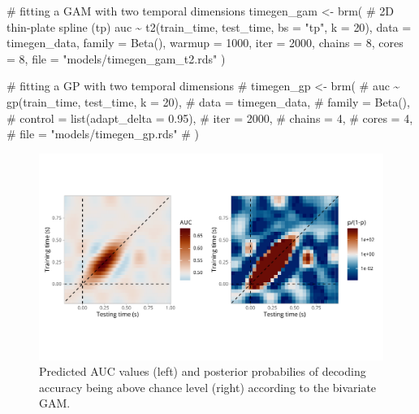 \documentclass[
  doc,
  floatsintext,
  longtable,
  a4paper,
  nolmodern,
  notxfonts,
  notimes,
  colorlinks=true,linkcolor=blue,citecolor=blue,urlcolor=blue]{apa7}
\newenvironment{Shaded}{\begin{snugshade}}{\end{snugshade}}
\newcommand{\AttributeTok}[1]{\textcolor[rgb]{0.40,0.45,0.13}{#1}}
\newcommand{\CommentTok}[1]{\textcolor[rgb]{0.37,0.37,0.37}{#1}}
\newcommand{\DecValTok}[1]{\textcolor[rgb]{0.68,0.00,0.00}{#1}}
\newcommand{\FunctionTok}[1]{\textcolor[rgb]{0.28,0.35,0.67}{#1}}
\newcommand{\NormalTok}[1]{\textcolor[rgb]{0.00,0.23,0.31}{#1}}
\newcommand{\OtherTok}[1]{\textcolor[rgb]{0.00,0.23,0.31}{#1}}
\newcommand{\SpecialCharTok}[1]{\textcolor[rgb]{0.37,0.37,0.37}{#1}}
\newcommand{\StringTok}[1]{\textcolor[rgb]{0.13,0.47,0.30}{#1}}
\begin{document}
\begin{Shaded}
\begin{Highlighting}[]
\CommentTok{\# fitting a GAM with two temporal dimensions}
\NormalTok{timegen\_gam }\OtherTok{\textless{}{-}} \FunctionTok{brm}\NormalTok{(}
    \CommentTok{\# 2D thin{-}plate spline (tp)}
\NormalTok{    auc }\SpecialCharTok{\textasciitilde{}} \FunctionTok{t2}\NormalTok{(train\_time, test\_time, }\AttributeTok{bs =} \StringTok{"tp"}\NormalTok{, }\AttributeTok{k =} \DecValTok{20}\NormalTok{),}
    \AttributeTok{data =}\NormalTok{ timegen\_data,}
    \AttributeTok{family =} \FunctionTok{Beta}\NormalTok{(),}
    \AttributeTok{warmup =} \DecValTok{1000}\NormalTok{,}
    \AttributeTok{iter =} \DecValTok{2000}\NormalTok{,}
    \AttributeTok{chains =} \DecValTok{8}\NormalTok{,}
    \AttributeTok{cores =} \DecValTok{8}\NormalTok{,}
    \AttributeTok{file =} \StringTok{"models/timegen\_gam\_t2.rds"}
\NormalTok{    )}

\CommentTok{\# fitting a GP with two temporal dimensions}
\CommentTok{\# timegen\_gp \textless{}{-} brm(}
\CommentTok{\#     auc \textasciitilde{} gp(train\_time, test\_time, k = 20),}
\CommentTok{\#     data = timegen\_data,}
\CommentTok{\#     family = Beta(),}
\CommentTok{\#     control = list(adapt\_delta = 0.95),}
\CommentTok{\#     iter = 2000,}
\CommentTok{\#     chains = 4,}
\CommentTok{\#     cores = 4,}
\CommentTok{\#     file = "models/timegen\_gp.rds"}
\CommentTok{\#     )}
\end{Highlighting}
\end{Shaded}

\begin{figure}[H]

\caption{Predicted AUC values (left) and posterior probabilies of
decoding accuracy being above chance level (right) according to the
bivariate GAM.}

{\centering \includegraphics[width=1\textwidth,height=\textheight]{brms_meeg_files/figure-pdf/gam-timegen-post-preds-1.pdf}

}

\end{figure}%
\end{document}
